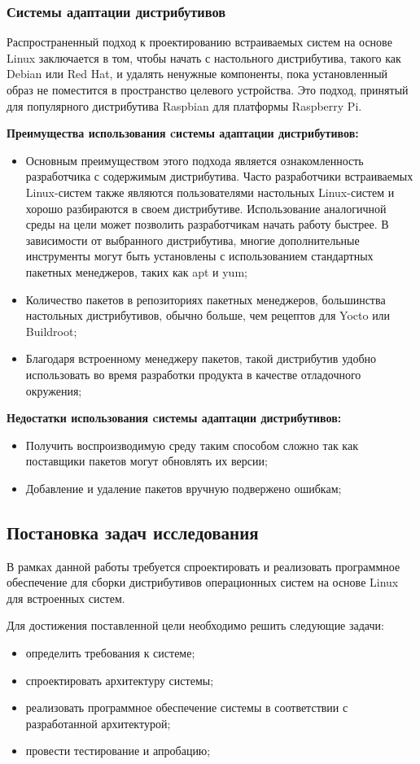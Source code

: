 \newpage
\subsubsection{Системы адаптации дистрибутивов}
Распространенный подход к проектированию встраиваемых систем на основе Linux заключается в том, чтобы начать с настольного дистрибутива, такого как Debian или Red Hat, и удалять ненужные компоненты, пока установленный образ не поместится в пространство целевого устройства\cite{ARMBIAN}. Это подход, принятый для популярного дистрибутива Raspbian для платформы Raspberry Pi.

\textbf{Преимущества использования cистемы адаптации дистрибутивов:}
\begin{itemize}
  \item Основным преимуществом этого подхода является ознакомленность разработчика с содержимым дистрибутива.
Часто разработчики встраиваемых Linux-систем также являются пользователями настольных Linux-систем и хорошо разбираются в своем дистрибутиве.
Использование аналогичной среды на цели может позволить разработчикам начать работу быстрее.
В зависимости от выбранного дистрибутива, многие дополнительные инструменты могут быть установлены с использованием стандартных пакетных менеджеров, таких как apt и yum;
  \item Количество пакетов в репозиториях пакетных менеджеров, большинства настольных дистрибутивов, обычно больше, чем рецептов для Yocto или Buildroot;
  \item Благодаря встроенному менеджеру пакетов, такой дистрибутив удобно использовать во время разработки продукта в качестве отладочного окружения;
\end{itemize}

\textbf{Недостатки использования cистемы адаптации дистрибутивов:}
\begin{itemize}
  \item Получить воспроизводимую среду таким способом сложно так как поставщики пакетов могут обновлять их версии;
  \item Добавление и удаление пакетов вручную подвержено ошибкам;
\end{itemize}

\newpage
\subsection{Постановка задач исследования}
В рамках данной работы требуется спроектировать и реализовать программное обеспечение для сборки дистрибутивов операционных систем на основе Linux для встроенных систем.

Для достижения поставленной цели необходимо решить следующие задачи:
\begin{itemize}
  \item определить требования к системе;
  \item спроектировать архитектуру системы;
  \item реализовать программное обеспечение системы в соответствии с разработанной архитектурой;
  \item провести тестирование и апробацию;
\end{itemize}
\newpage
